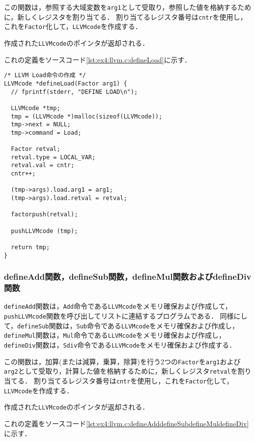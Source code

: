 \documentclass[uplatex]{jsarticle}
\begin{document}
この関数は，参照する大域変数を\verb#arg1#として受取り，参照した値を格納するために，新しくレジスタを割り当てる．
割り当てるレジスタ番号は\verb#cntr#を使用し，これを\verb#Factor#化して，\verb#LLVMcode#を作成する．

作成された\verb#LLVMcode#のポインタが返却される．

これの定義をソースコード\ref{lst:ex4:llvm.c:defineLoad}に示す．

\begin{lstlisting}[caption=defineLoad関数の定義,label=lst:ex4:llvm.c:defineLoad]
/* LLVM Load命令の作成 */
LLVMcode *defineLoad(Factor arg1) {
  // fprintf(stderr, "DEFINE LOAD\n");

  LLVMcode *tmp;
  tmp = (LLVMcode *)malloc(sizeof(LLVMcode));
  tmp->next = NULL;
  tmp->command = Load;

  Factor retval;
  retval.type = LOCAL_VAR;
  retval.val = cntr;
  cntr++;

  (tmp->args).load.arg1 = arg1;
  (tmp->args).load.retval = retval;

  factorpush(retval);

  pushLLVMcode (tmp);

  return tmp;
}
\end{lstlisting}

\subsubsection{defineAdd関数，defineSub関数，defineMul関数およびdefineDiv関数}
\verb#defineAdd#関数は，\verb#Add#命令である\verb#LLVMcode#をメモリ確保および作成して，\verb#pushLLVMcode#関数を呼び出してリストに連結するプログラムである．
同様にして，\verb#defineSub#関数は，\verb#Sub#命令である\verb#LLVMcode#をメモリ確保および作成し，\verb#defineMul#関数は，\verb#Mul#命令である\verb#LLVMcode#をメモリ確保および作成し，\verb#defineDiv#関数は，\verb#Sdiv#命令である\verb#LLVMcode#をメモリ確保および作成する．

この関数は，加算(または減算，乗算，除算)を行う2つの\verb#Factor#を\verb#arg1#および\verb#arg2#として受取り，計算した値を格納するために，新しくレジスタ\verb#retval#を割り当てる．
割り当てるレジスタ番号は\verb#cntr#を使用し，これを\verb#Factor#化して，\verb#LLVMcode#を作成する．

作成された\verb#LLVMcode#のポインタが返却される．

これの定義をソースコード\ref{lst:ex4:llvm.c:defineAdddefineSubdefineMuldefineDiv}に示す．
\end{document}

